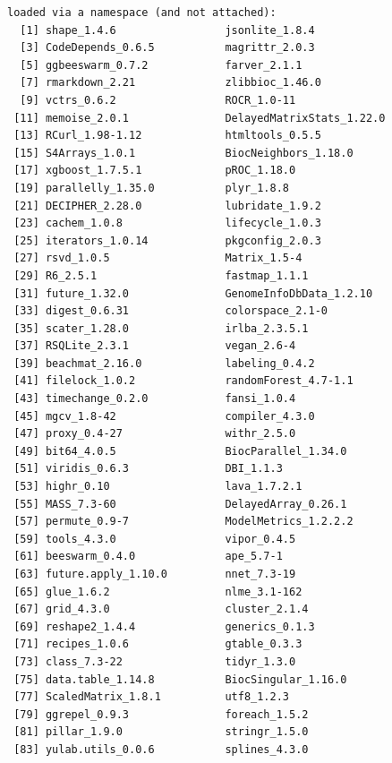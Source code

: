\documentclass[
]{book}
\begin{document}
\begin{verbatim}
loaded via a namespace (and not attached):
  [1] shape_1.4.6                 jsonlite_1.8.4             
  [3] CodeDepends_0.6.5           magrittr_2.0.3             
  [5] ggbeeswarm_0.7.2            farver_2.1.1               
  [7] rmarkdown_2.21              zlibbioc_1.46.0            
  [9] vctrs_0.6.2                 ROCR_1.0-11                
 [11] memoise_2.0.1               DelayedMatrixStats_1.22.0  
 [13] RCurl_1.98-1.12             htmltools_0.5.5            
 [15] S4Arrays_1.0.1              BiocNeighbors_1.18.0       
 [17] xgboost_1.7.5.1             pROC_1.18.0                
 [19] parallelly_1.35.0           plyr_1.8.8                 
 [21] DECIPHER_2.28.0             lubridate_1.9.2            
 [23] cachem_1.0.8                lifecycle_1.0.3            
 [25] iterators_1.0.14            pkgconfig_2.0.3            
 [27] rsvd_1.0.5                  Matrix_1.5-4               
 [29] R6_2.5.1                    fastmap_1.1.1              
 [31] future_1.32.0               GenomeInfoDbData_1.2.10    
 [33] digest_0.6.31               colorspace_2.1-0           
 [35] scater_1.28.0               irlba_2.3.5.1              
 [37] RSQLite_2.3.1               vegan_2.6-4                
 [39] beachmat_2.16.0             labeling_0.4.2             
 [41] filelock_1.0.2              randomForest_4.7-1.1       
 [43] timechange_0.2.0            fansi_1.0.4                
 [45] mgcv_1.8-42                 compiler_4.3.0             
 [47] proxy_0.4-27                withr_2.5.0                
 [49] bit64_4.0.5                 BiocParallel_1.34.0        
 [51] viridis_0.6.3               DBI_1.1.3                  
 [53] highr_0.10                  lava_1.7.2.1               
 [55] MASS_7.3-60                 DelayedArray_0.26.1        
 [57] permute_0.9-7               ModelMetrics_1.2.2.2       
 [59] tools_4.3.0                 vipor_0.4.5                
 [61] beeswarm_0.4.0              ape_5.7-1                  
 [63] future.apply_1.10.0         nnet_7.3-19                
 [65] glue_1.6.2                  nlme_3.1-162               
 [67] grid_4.3.0                  cluster_2.1.4              
 [69] reshape2_1.4.4              generics_0.1.3             
 [71] recipes_1.0.6               gtable_0.3.3               
 [73] class_7.3-22                tidyr_1.3.0                
 [75] data.table_1.14.8           BiocSingular_1.16.0        
 [77] ScaledMatrix_1.8.1          utf8_1.2.3                 
 [79] ggrepel_0.9.3               foreach_1.5.2              
 [81] pillar_1.9.0                stringr_1.5.0              
 [83] yulab.utils_0.0.6           splines_4.3.0              

\end{verbatim}
\end{document}
